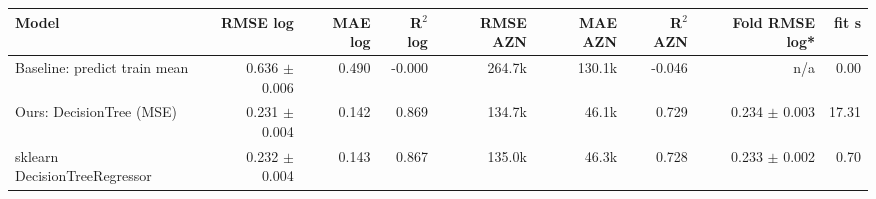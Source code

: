 \begin{tabular}{@{}lrrrrrrrr@{}}
\toprule
Model & RMSE log & MAE log & R$^2$ log & RMSE AZN & MAE AZN & R$^2$ AZN & Fold RMSE log* & fit s \\
\midrule
Baseline: predict train mean & 0.636 $\pm$ 0.006 & 0.490 & -0.000 & 264.7k & 130.1k & -0.046 & n/a & 0.00 \\
Ours: DecisionTree (MSE) & 0.231 $\pm$ 0.004 & 0.142 & 0.869 & 134.7k & 46.1k & 0.729 & 0.234 $\pm$ 0.003 & 17.31 \\
sklearn DecisionTreeRegressor & 0.232 $\pm$ 0.004 & 0.143 & 0.867 & 135.0k & 46.3k & 0.728 & 0.233 $\pm$ 0.002 & 0.70 \\
\bottomrule
\end{tabular}
